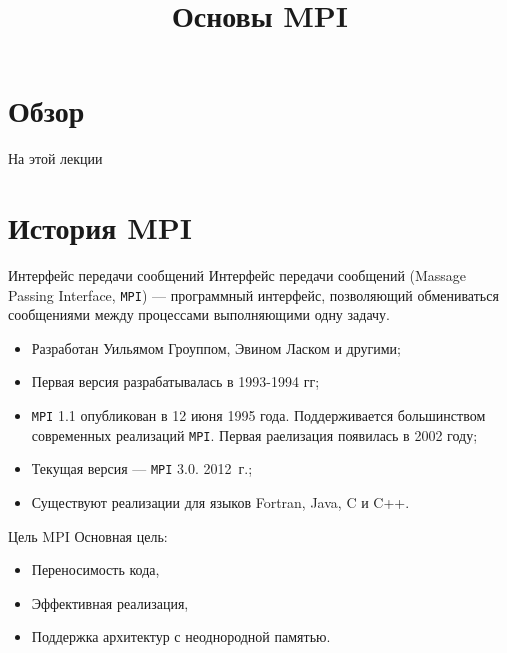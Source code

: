 

\title{Основы MPI}



\begin{frame}
\titlepage
\end{frame}

\section*{Обзор}

\begin{frame}{На этой лекции}
\tableofcontents
\end{frame}

\section{История MPI}

\begin{frame}{Интерфейс передачи сообщений}
Интерфейс передачи сообщений (\abbr Massage Passing Interface, \texttt{MPI}) --- программный интерфейс, позволяющий обмениваться сообщениями между процессами выполняющими одну задачу.
\vfill
\begin{itemize}
    \item Разработан Уильямом Гроуппом, Эвином Ласком и другими;
    \item Первая версия разрабатывалась в 1993-1994 гг;
    \item \texttt{MPI} 1.1 опубликован в 12 июня 1995 года. Поддерживается
    большинством современных реализаций \texttt{MPI}. Первая раелизация
    появилась в 2002 году;
    \item Текущая версия --- \texttt{MPI} 3.0. 2012~г.;
    \item Существуют реализации для языков Fortran, Java, C и C++.
\end{itemize}
\end{frame}

\begin{frame}{Цель MPI}
Основная цель:
\begin{itemize}
    \item Переносимость кода,
    \item Эффективная реализация,
    \item Поддержка архитектур с неоднородной памятью.
\end{itemize}
\end{frame}

